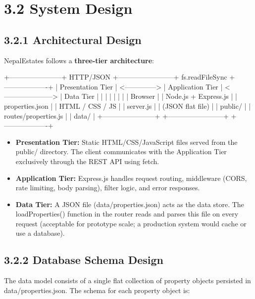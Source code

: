 \documentclass[12pt,a4paper]{report}
\begin{document}
\section{3.2 System Design}
\subsection{3.2.1 Architectural Design}
NepalEstates follows a \textbf{three-tier architecture}:

+-----------------------+     HTTP/JSON     +------------------------+     fs.readFileSync     +-------------------+
|   Presentation Tier   | <--------------> |    Application Tier    | <---------------------> |    Data Tier      |
|                       |                  |                        |                         |                   |
|  Browser              |                  |  Node.js + Express.js  |                         |  properties.json  |
|  HTML / CSS / JS      |                  |  server.js             |                         |  (JSON flat file) |
|  public/              |                  |  routes/properties.js  |                         |  data/            |
+-----------------------+                  +------------------------+                         +-------------------+

\begin{itemize}
  \item \textbullet{} \textbf{Presentation Tier:} Static HTML/CSS/JavaScript files served from the public/ directory. The client communicates with the Application Tier exclusively through the REST API using fetch.
  \item \textbullet{} \textbf{Application Tier:} Express.js handles request routing, middleware (CORS, rate limiting, body parsing), filter logic, and error responses.
  \item \textbullet{} \textbf{Data Tier:} A JSON file (data/properties.json) acts as the data store. The loadProperties() function in the router reads and parses this file on every request (acceptable for prototype scale; a production system would cache or use a database).
\end{itemize}
\subsection{3.2.2 Database Schema Design}
The data model consists of a single flat collection of property objects persisted in data/properties.json. The schema for each property object is:
\end{document}
